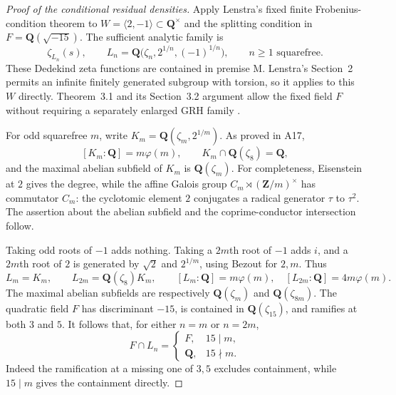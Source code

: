 \documentclass[11pt,a4paper]{article}
\begin{document}
\begin{proof}[Proof of the conditional residual densities]
Apply Lenstra's fixed finite Frobenius-condition theorem to
$W=\langle2,-1\rangle\subset\mathbf Q^\times$ and the
splitting condition in $F=\mathbf Q(\sqrt{-15})$.
The sufficient analytic family is
\[
 \zeta_{L_n}(s),\qquad
 L_n=\mathbf Q\bigl(\zeta_n,2^{1/n},(-1)^{1/n}\bigr),
                   \qquad n\ge1\text{ squarefree}.          \tag{SO.16}
\]
These Dedekind zeta functions are contained in premise M.
Lenstra's Section~2 permits an infinite finitely generated
subgroup with torsion, so it applies to this $W$ directly.
Theorem~3.1 and its Section~3.2 argument allow the fixed field
$F$ without requiring a separately enlarged GRH family
\cite[\S\S2--3, Theorem~3.1]{Lenstra1977}.

For odd squarefree $m$, write
$K_m=\mathbf Q(\zeta_m,2^{1/m})$.  As proved in A17,
\[
 [K_m:\mathbf Q]=m\varphi(m),\qquad
 K_m\cap\mathbf Q(\zeta_8)=\mathbf Q,
\]
and the maximal abelian subfield of $K_m$ is
$\mathbf Q(\zeta_m)$.  For completeness, Eisenstein at $2$
gives the degree, while the affine Galois group
$C_m\rtimes(\mathbf Z/m)^\times$ has commutator $C_m$:
the cyclotomic element $2$ conjugates a radical generator
$\tau$ to $\tau^2$.  The assertion about the abelian subfield
and the coprime-conductor intersection follow.

Taking odd roots of $-1$ adds nothing.  Taking a $2m$th root
of $-1$ adds $i$, and a $2m$th root of $2$ is generated by
$\sqrt2$ and $2^{1/m}$, using Bezout for $2,m$.  Thus
\[
 L_m=K_m,\qquad L_{2m}=\mathbf Q(\zeta_8)K_m,\qquad
 [L_m:\mathbf Q]=m\varphi(m),\quad
 [L_{2m}:\mathbf Q]=4m\varphi(m).                           \tag{SO.17}
\]
The maximal abelian subfields are respectively
$\mathbf Q(\zeta_m)$ and $\mathbf Q(\zeta_{8m})$.
The quadratic field $F$ has discriminant $-15$, is contained
in $\mathbf Q(\zeta_{15})$, and ramifies at both $3$ and $5$.
It follows that, for either $n=m$ or $n=2m$,
\[
 F\cap L_n=
 \begin{cases}
 F,&15\mid m,\\
 \mathbf Q,&15\nmid m.
 \end{cases}                                               \tag{SO.18}
\]
Indeed the ramification at a missing one of $3,5$ excludes
containment, while $15\mid m$ gives the containment directly.


\end{proof}
\end{document}
